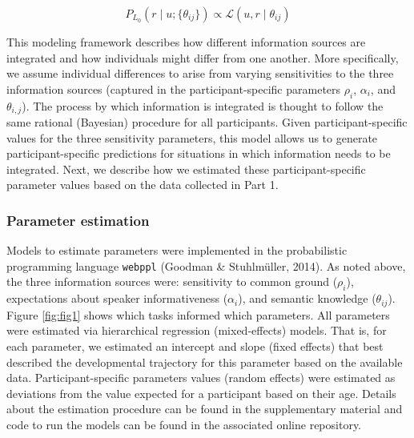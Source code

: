 \documentclass[
  man,mask,floatsintext]{apa6}
\begin{document}
\begin{equation}
P_{L_0}(r \mid u; \{\theta_{ij}\}) \propto \mathcal{L}(u, r \mid \theta_{ij})
\label{eq:rsafull3}
\end{equation}

This modeling framework describes how different information sources are integrated and how individuals might differ from one another. More specifically, we assume individual differences to arise from varying sensitivities to the three information sources (captured in the participant-specific parameters \(\rho_i\), \(\alpha_i\), and \(\theta_{i,j}\)). The process by which information is integrated is thought to follow the same rational (Bayesian) procedure for all participants. Given participant-specific values for the three sensitivity parameters, this model allows us to generate participant-specific predictions for situations in which information needs to be integrated. Next, we describe how we estimated these participant-specific parameter values based on the data collected in Part 1.

\hypertarget{parameter-estimation}{%
\subsubsection{Parameter estimation}\label{parameter-estimation}}

Models to estimate parameters were implemented in the probabilistic programming language \texttt{webppl} (Goodman \& Stuhlmüller, 2014). As noted above, the three information sources were: sensitivity to common ground (\(\rho_i\)), expectations about speaker informativeness (\(\alpha_i\)), and semantic knowledge (\(\theta_{ij}\)). Figure \ref{fig:fig1} shows which tasks informed which parameters. All parameters were estimated via hierarchical regression (mixed-effects) models. That is, for each parameter, we estimated an intercept and slope (fixed effects) that best described the developmental trajectory for this parameter based on the available data. Participant-specific parameters values (random effects) were estimated as deviations from the value expected for a participant based on their age. Details about the estimation procedure can be found in the supplementary material and code to run the models can be found in the associated online repository.
\end{document}
